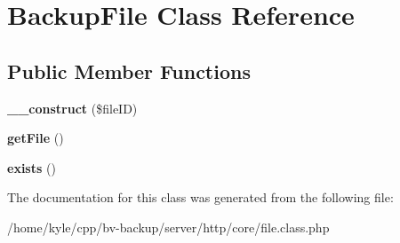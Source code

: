 \hypertarget{class_backup_file}{}\section{Backup\+File Class Reference}
\label{class_backup_file}
\subsection*{Public Member Functions}
\begin{DoxyCompactItemize}
\item 
\mbox{\label{class_backup_file_afb7310a4cdd9a7d338e38dc085c29dcf}} 
{\bfseries \+\_\+\+\_\+construct} (\$file\+ID)
\item 
\mbox{\label{class_backup_file_ad32c7a1f2a030009fb1eba67ee2818db}} 
{\bfseries get\+File} ()
\item 
\mbox{\label{class_backup_file_ad8369ed74cf9d01c608092b99fe7a05b}} 
{\bfseries exists} ()
\end{DoxyCompactItemize}


The documentation for this class was generated from the following file\+:\begin{DoxyCompactItemize}
\item 
/home/kyle/cpp/bv-\/backup/server/http/core/file.\+class.\+php\end{DoxyCompactItemize}
